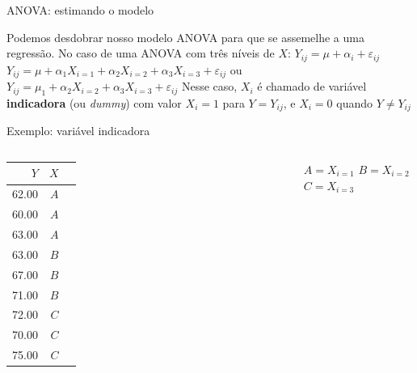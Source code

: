 \documentclass{beamer}\usepackage[]{graphicx}\usepackage[]{color}
\begin{document}
\begin{frame}{ANOVA: estimando o modelo}

Podemos desdobrar nosso modelo ANOVA para que se assemelhe a uma regressão. No caso de uma ANOVA com três níveis de $X$:
\vfill
$Y_{ij} = \mu + \alpha _i + \varepsilon _{ij}$ \pause
\vfill
$Y_{ij} = \mu + \alpha _1 X_{i=1} + \alpha _2 X_{i=2} + \alpha _3 X_{i=3} + \varepsilon _{ij}$  ou \pause
\vfill
$Y_{ij} = \mu_1 + \alpha _2 X_{i=2} + \alpha _3 X_{i=3} + \varepsilon _{ij}$ \pause
\vfill
Nesse caso, $X_i$ é chamado de variável \textbf{indicadora} (ou \emph{dummy}) com valor $X_i = 1$ para $Y = Y_{ij}$, e $X_i = 0$ quando $Y \neq Y_{ij}$


\end{frame}


\begin{frame}{Exemplo: variável indicadora}

\begin{columns}[c]


\begin{tabular}{rrl}
  \hline
  $Y$ & $X$ \\ 
  \hline
  62.00 & $A$ \\ 
  60.00 & $A$ \\ 
  63.00 & $A$ \\ 
  63.00 & $B$ \\ 
  67.00 & $B$ \\ 
  71.00 & $B$ \\ 
  72.00 & $C$ \\ 
  70.00 & $C$ \\ 
  75.00 & $C$ \\ 
  \hline
\end{tabular}


$A = X_{i=1}$
\vfill
$B = X_{i=2}$
\vfill
$C = X_{i=3}$

\end{columns}

\end{frame}
\end{document}
